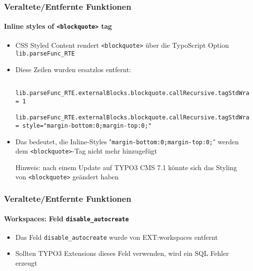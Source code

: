 \begin{frame}[fragile]
	\frametitle{Veraltete/Entfernte Funktionen}
	\framesubtitle{Inline styles of \texttt{<blockquote>} tag}

	\lstset{basicstyle=\tiny\ttfamily}

	\begin{itemize}

		\item CSS Styled Content rendert \texttt{<blockquote>} über die TypoScript Option \texttt{lib.parseFunc\_RTE}
		\item Diese Zeilen wurden ersatzlos entfernt:

			\begin{lstlisting}
				lib.parseFunc_RTE.externalBlocks.blockquote.callRecursive.tagStdWrap.HTMLparser = 1
				lib.parseFunc_RTE.externalBlocks.blockquote.callRecursive.tagStdWrap.HTMLparser.tags.blockquote.overrideAttribs = style="margin-bottom:0;margin-top:0;"
			\end{lstlisting}

		\item Das bedeutet, die Inline-Styles "\texttt{margin-bottom:0;margin-top:0;}"\newline
			werden dem \texttt{<blockquote>}-Tag nicht mehr hinzugefügt

			\vspace{0.2cm}

			\begingroup
				\color{red}
					Hinweis: nach einem Update auf TYPO3 CMS 7.1 könnte sich das
					Styling von \texttt{<blockquote>} geändert haben
			\endgroup

	\end{itemize}

\end{frame}


\begin{frame}[fragile]
	\frametitle{Veraltete/Entfernte Funktionen}
	\framesubtitle{Workspaces: Feld \texttt{disable\_autocreate}}

	\begin{itemize}
		\item Das Feld \texttt{disable\_autocreate} wurde von EXT:workspaces entfernt
		\item Sollten TYPO3 Extensions dieses Feld verwenden, wird ein SQL Fehler erzeugt
	\end{itemize}

\end{frame}

